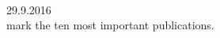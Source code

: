 \documentclass[12pt,a4]{report}
\begin{document}
\newcommand{\emp}[1]
{\it{#1}\rm}

\newenvironment{Body} %
 {\begin{list}{}{%
	\vspace{-0.6cm}
	\setlength{\leftmargin}{1.2cm}}
	  \item[]\ignorespaces}
 {\end{list}}


\vspace{-2cm}


 \\

 \hfill 29.9.2016\\


%
 mark the ten most important publications.
\vspace{0.3cm}


%

\vspace{0.3cm}





\vspace{0.4cm}

\end{document}
